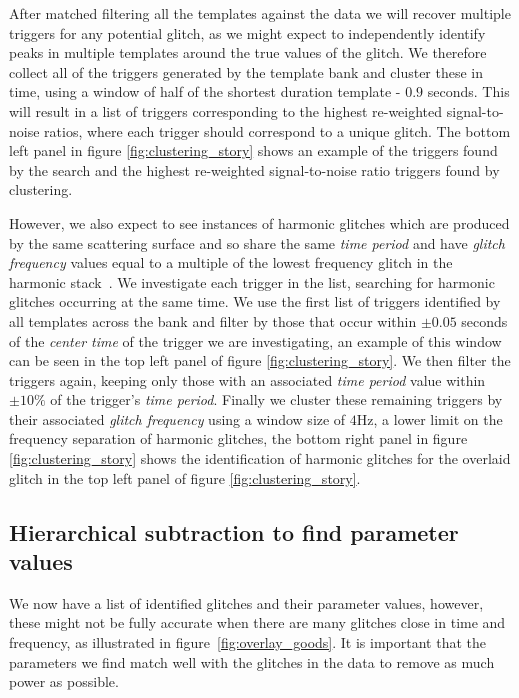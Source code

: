 After matched filtering all the templates against the data we will recover multiple triggers for any potential \scl{} glitch, as we might expect to independently identify peaks in multiple templates around the true values of the glitch. We therefore collect all of the triggers generated by the template bank and cluster these in time, using a window of half of the shortest duration template - $0.9$ seconds. This will result in a list of triggers corresponding to the highest re-weighted signal-to-noise ratios, where each trigger should correspond to a unique \scl{} glitch. The bottom left panel in figure \ref{fig:clustering_story} shows an example of the triggers found by the search and the highest re-weighted signal-to-noise ratio triggers found by clustering.

However, we also expect to see instances of harmonic glitches which are produced by the same scattering surface and so share the same \emph{time period} and have \emph{glitch frequency} values equal to a multiple of the lowest frequency glitch in the harmonic stack~\cite{TAccadia}. We investigate each trigger in the list, searching for harmonic glitches occurring at the same time. We use the first list of triggers identified by all templates across the bank and filter by those that occur within $\pm0.05$ seconds of the \emph{center time} of the trigger we are investigating, an example of this window can be seen in the top left panel of figure \ref{fig:clustering_story}. We then filter the triggers again, keeping only those with an associated \emph{time period} value within $\pm 10 \%$ of the trigger's \emph{time period}. Finally we cluster these remaining triggers by their associated \emph{glitch frequency} using a window size of $4$Hz, a lower limit on the frequency separation of harmonic glitches, the bottom right panel in figure \ref{fig:clustering_story} shows the identification of harmonic glitches for the overlaid \scl{} glitch in the top left panel of figure \ref{fig:clustering_story}.

\subsection{Hierarchical subtraction to find parameter values}

We now have a list of identified \scl{} glitches and their parameter values, however, these might not be fully accurate when there are many glitches close in time and frequency, as illustrated in figure~\ref{fig:overlay_goods}. It is important that the parameters we find match well with the glitches in the data to remove as much power as possible.


